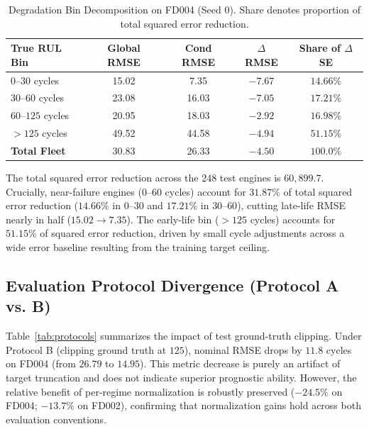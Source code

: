 \documentclass[conference]{IEEEtran}
\begin{document}
\begin{table}[t]
\caption{Degradation Bin Decomposition on FD004 (Seed 0). Share denotes proportion of total squared error reduction.}
\label{tab:bin_decomp}
\centering
\begin{tabular}{lcccc}
\toprule
True RUL Bin & Global RMSE & Cond RMSE & $\Delta$ RMSE & Share of $\Delta$SE \\
\midrule
$0$--$30$ cycles & 15.02 & 7.35 & $-7.67$ & $14.66\%$ \\
$30$--$60$ cycles & 23.08 & 16.03 & $-7.05$ & $17.21\%$ \\
$60$--$125$ cycles & 20.95 & 18.03 & $-2.92$ & $16.98\%$ \\
$>125$ cycles & 49.52 & 44.58 & $-4.94$ & $51.15\%$ \\
\midrule
\textbf{Total Fleet} & 30.83 & 26.33 & $-4.50$ & $100.0\%$ \\
\bottomrule
\end{tabular}
\end{table}

The total squared error reduction across the 248 test engines is $60{,}899.7$. Crucially, near-failure engines ($0$--$60$ cycles) account for $31.87\%$ of total squared error reduction ($14.66\%$ in $0$--$30$ and $17.21\%$ in $30$--$60$), cutting late-life RMSE nearly in half ($15.02 \to 7.35$). The early-life bin ($>125$ cycles) accounts for $51.15\%$ of squared error reduction, driven by small cycle adjustments across a wide error baseline resulting from the training target ceiling.

\subsection{Evaluation Protocol Divergence (Protocol A vs. B)}
Table~\ref{tab:protocols} summarizes the impact of test ground-truth clipping. Under Protocol B (clipping ground truth at $125$), nominal RMSE drops by $11.8$ cycles on FD004 (from $26.79$ to $14.95$). This metric decrease is purely an artifact of target truncation and does not indicate superior prognostic ability. However, the relative benefit of per-regime normalization is robustly preserved ($-24.5\%$ on FD004; $-13.7\%$ on FD002), confirming that normalization gains hold across both evaluation conventions.
\end{document}
